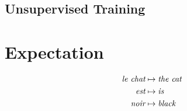 \documentclass[twoside,twocolumn]{article}
\begin{document}
\subsection{Unsupervised Training}

\section{Expectation}


\begin{equation}
\centering
\begin{split}
\textit{le chat} &\mapsto \textit{the cat} \\
\textit{est} &\mapsto \textit{is} \\
\textit{noir} &\mapsto \textit{black} \\
\end{split}
\end{equation}



\end{document}
